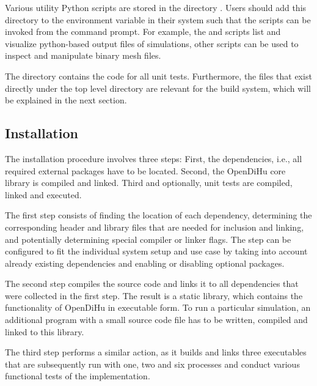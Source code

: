 Various utility Python scripts are stored in the directory . Users should add this directory to the  environment variable in their system such that the scripts can be invoked from the command prompt. For example, the  and  scripts list and visualize python-based output files of simulations, other scripts can be used to inspect and manipulate binary mesh files.

The directory  contains the code for all unit tests. Furthermore, the files that exist directly under the top level  directory are relevant for the build system, which will be explained in the next section.

\subsection{Installation}\label{sec:installation}

The installation procedure involves three steps: First, the dependencies, i.e., all required external packages have to be located. Second, the OpenDiHu core library is compiled and linked. Third and optionally, unit tests are compiled, linked and executed.

The first step consists of finding the location of each dependency, determining the corresponding header and library files that are needed for inclusion and linking, and potentially determining special compiler or linker flags. The step can be configured to fit the individual system setup and use case by taking into account already existing dependencies and enabling or disabling optional packages.

The second step compiles the source code and links it to all dependencies that were collected in the first step. The result is a static library, which contains the functionality of OpenDiHu in executable form. To run a particular simulation, an additional program with a small source code file has to be written, compiled and linked to this library.

The third step performs a similar action, as it builds and links three executables that are subsequently run with one, two and six processes and conduct various functional tests of the implementation.

